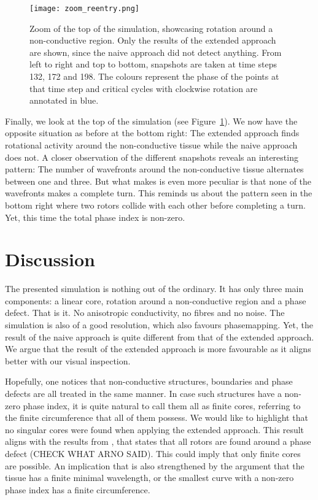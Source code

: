 \documentclass[twocolumn]{article}
\begin{document}
\begin{figure}[ht]
  \centering
  \texttt{[image: zoom\_reentry.png]}
  \caption{Zoom of the top of the simulation, showcasing rotation around a
    non-conductive region. Only the results of the extended approach are
    shown, since the naive approach did not detect anything. From left to
    right and top to bottom, snapshots are taken at time steps 132, 172 and
    198. The colours represent the phase of the points at that time step and
  critical cycles with clockwise rotation are annotated in blue.}
  \label{fig:zoom-reentry}
\end{figure}

Finally, we look at the top of the simulation (see
Figure~\ref{fig:zoom-reentry}). We now have the opposite situation as
before at the bottom right: The extended approach finds rotational
activity around the non-conductive tissue while the naive approach does
not. A closer observation of the different snapshots reveals an
interesting pattern: The number of wavefronts around the non-conductive
tissue alternates between one and three. But what makes is even more
peculiar is that none of the wavefronts makes a complete turn. This
reminds us about the pattern seen in the bottom right where two rotors
collide with each other before completing a turn. Yet, this time the
total phase index is non-zero.

\section{Discussion}\label{discussion}

The presented simulation is nothing out of the ordinary.
It has only three main components:
a linear core, rotation around a non-conductive region and a phase defect.
That is it. No anisotropic conductivity, no fibres and no noise.
The simulation is also of a good resolution, which also favours phasemapping.
Yet, the result of the naive approach is quite different
from that of the extended approach.
We argue that the result of the extended approach is more favourable
as it aligns better with our visual inspection.



Hopefully, one notices that non-conductive structures, boundaries and
phase defects are all treated in the same manner.
In case such structures have a non-zero phase index,
it is quite natural to call them all as finite cores,
referring to the finite circumference that all of them possess.
We would like to highlight that no singular cores were found when
applying the extended approach.
This result aligns with the results from \autocite{tomii2021spatial, arno2021a},
that states that all rotors are found around a phase defect (CHECK
WHAT ARNO SAID).
This could imply that only finite cores are possible.
An implication that is also strengthened by the argument that the
tissue has a finite minimal wavelength,
or the smallest curve with a non-zero phase index has a finite circumference.
\end{document}
